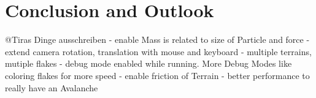 \documentclass{sig-alternate-05-2015}
\begin{document}
\section{Conclusion and Outlook}
@Tiras Dinge ausschreiben
- enable Mass is related to size of Particle and force
- extend camera rotation, translation with mouse and keyboard
- multiple terrains, mutiple flakes
- debug mode enabled while running. More Debug Modes like coloring flakes for more speed
- enable friction of Terrain
- better performance to really have an Avalanche


 
\end{document}
